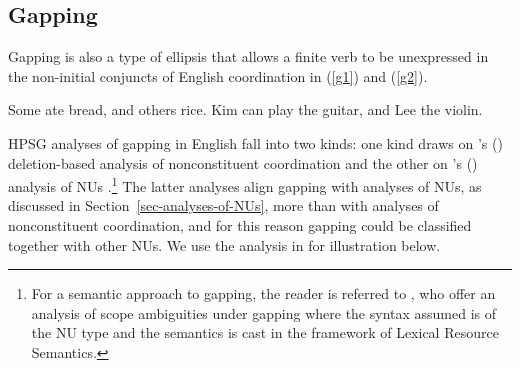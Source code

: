 \documentclass[output=paper
	        ,collection
	        ,collectionchapter
 	        ,biblatex
                ,babelshorthands
                ,newtxmath
                ,draftmode
                ,colorlinks, citecolor=brown
]{langscibook}
\begin{document}
{%
%
%
%

%
%
%
%
%
%
%
%
%
%
%
%
%



\subsection{Gapping}

Gapping is also a type of ellipsis that allows a finite
verb to be unexpressed in the non-initial conjuncts of English coordination in (\ref{g1}) and (\ref{g2}).

\ea Some ate bread, and others rice.\label{g1}\z
\ea Kim can play the guitar, and Lee the violin.\label{g2}\z
%
%
%
%

HPSG analyses of gapping in English fall into two kinds: one kind draws on \citeauthor{Beavers2004}'s (\citeyear{Beavers2004}) deletion-based analysis of nonconstituent coordination \citep{Chaves2009} and the other on \citeauthor{Ginzburg:Sag:2000}'s (\citeyear{Ginzburg:Sag:2000}) analysis of NUs \citep{Abeille2014}.\footnote{For a semantic approach to gapping, the reader is referred to \citet{Park2018}, who offer an analysis of scope ambiguities under gapping where the syntax assumed is of the NU type and the semantics is cast in the framework of Lexical Resource Semantics.} The latter analyses align gapping with analyses of NUs, as discussed in Section~\ref{sec-analyses-of-NUs}, more than with analyses of nonconstituent coordination, and for this reason gapping could be classified together with other NUs. We use the analysis in \citet{Abeille2014} for illustration below.


}
\end{document}
